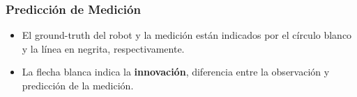 \begin{frame}
	\frametitle{Predicción de Medición}
	
    \begin{figure}[!h]
        \centering
    \end{figure}
    \footnotesize
    \begin{itemize}
        \item El ground-truth del robot y la medición están indicados por el círculo blanco y la línea en negrita, respectivamente.

        \item La flecha blanca indica la \textbf{innovación}, diferencia entre la observación y predicción de la medición.
    \end{itemize}

    
	
\end{frame}

